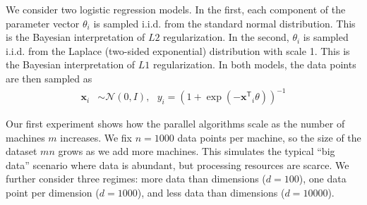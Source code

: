 \documentclass[twoside]{article}
\newcommand{\x}{\mathbf{x}}
\newcommand{\normal}[2]{\ensuremath{\mathcal{N}\left({{#1}},{{#2}}\right)}}
\newcommand{\trans}[1]{\ensuremath{{#1}^{\mathsf{T}}}}
\begin{document}
We consider two logistic regression models.
In the first,
each component of the parameter vector $\theta_i$ is sampled i.i.d. from the standard normal distribution.
This is the Bayesian interpretation of $L2$ regularization.
In the second, $\theta_i$ is sampled i.i.d. from the Laplace (two-sided exponential) distribution with scale 1.
This is the Bayesian interpretation of $L1$ regularization.
In both models, the data points are then sampled as
\begin{equation}
\begin{aligned}
\x_i &\sim \normal{0}{I}
,
~~~
y_i = \left(1+\exp(-\trans\x_i\theta)\right)^{-1}
\end{aligned}
\end{equation}

Our first experiment shows how the parallel algorithms scale as the number of machines $m$ increases.
We fix $n=1000$ data points per machine, so the size of the dataset $mn$ grows as we add more machines.
This simulates the typical ``big data'' scenario where data is abundant,
but processing resources are scarce.
We further consider three regimes:
more data than dimensions ($d=100$),
one data point per dimension ($d=1000$),
and less data than dimensions ($d=10000$).
\end{document}
